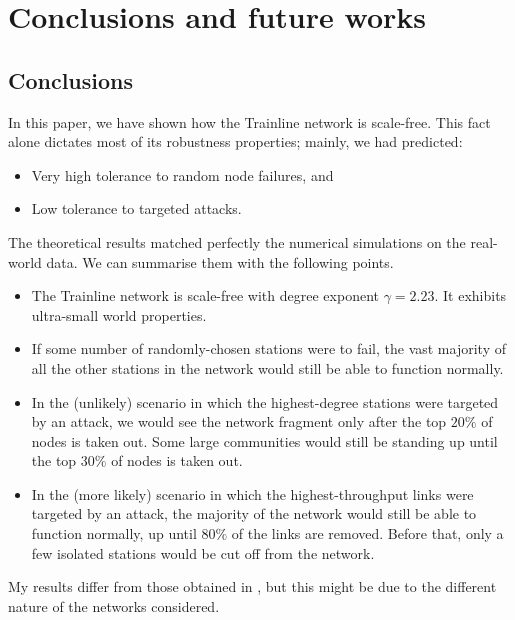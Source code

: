\section{Conclusions and future works}

\subsection{Conclusions}
In  this paper, we have shown how the Trainline network is scale-free. This fact alone dictates most of its robustness properties; mainly, we had predicted:
\begin{itemize}
    \item Very high tolerance to random node failures, and
    \item Low tolerance to targeted attacks.
\end{itemize}
The theoretical results matched perfectly the numerical simulations on the real-world data. We can summarise them with the following points.
\begin{itemize}
    \item The Trainline network is scale-free with degree exponent $\gamma=2.23$. It exhibits ultra-small world properties.
    \item If some number of randomly-chosen stations were to fail, the vast majority of all the other stations in the network would still be able to function normally.
    \item In the (unlikely) scenario in which the highest-degree stations were targeted by an attack, we would see the network fragment only after the top $20\%$ of nodes is taken out. Some large communities would still be standing up until the top $30\%$ of nodes is taken out.
    \item In the (more likely) scenario in which the highest-throughput links were targeted by an attack, the majority of the network would still be able to function normally, up until $80\%$ of the links are removed. Before that, only a few isolated stations would be cut off from the network.
\end{itemize}
My results differ from those obtained in \cite{gamma4}, but this might be due to the different nature of the networks considered.

